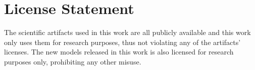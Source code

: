 \documentclass[11pt]{article}
\begin{document}
\section{License Statement}
The scientific artifacts used in this work are all publicly available and this work only uses them for research purposes, thus not violating any of the artifacts' licenses. The new models released in this work is also licensed for research purposes only, prohibiting any other misuse.
\end{document}
